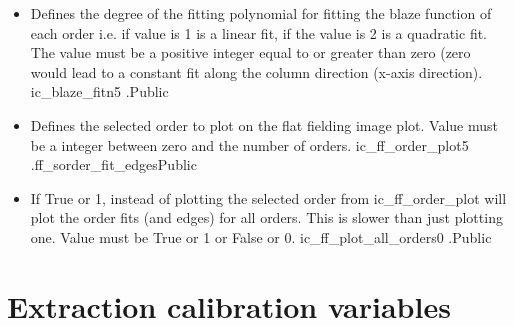 \begin{itemize}
\item {}
{Defines the degree of the fitting polynomial for fitting the blaze function of each order i.e. if value is 1 is a linear fit, if the value is 2 is a quadratic fit. The value must be a positive integer equal to or greater than zero (zero would lead to a constant fit along the column direction (x-axis direction).}
{ic\_blaze\_fitn}{5}
{\calFFraw}{\constantsfile}{\calFFraw.\progMAIN}{Public}


\item {}
{Defines the selected order to plot on the flat fielding image plot. Value must be a integer between zero and the number of orders.}
{ic\_ff\_order\_plot}{5}
{\calFFraw}{\constantsfile}{\spirouPlot.ff\_sorder\_fit\_edges}{Public}

\item {}
{If True or 1, instead of plotting the selected order from ic\_ff\_order\_plot will plot the order fits (and edges) for all orders. This is slower than just plotting one. Value must be True or 1 or False or 0.}
{ic\_ff\_plot\_all\_orders}{0}
{\calFFraw}{\constantsfile}{\calFFraw.\progMAIN}{Public}

\end{itemize}


\clearpage
\newpage
\section{Extraction calibration variables}
\label{ch:variables:extraction}

